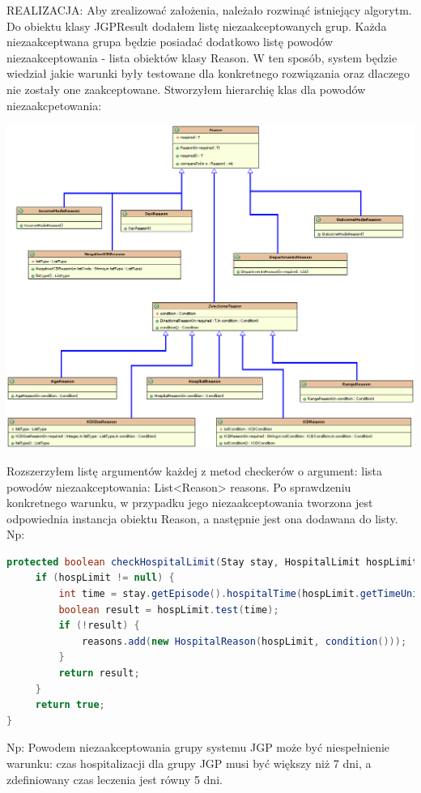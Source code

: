 REALIZACJA: Aby zrealizować założenia, należało rozwinąć istniejący algorytm. Do obiektu klasy JGPResult dodałem listę niezaakceptowanych grup. Każda niezaakceptwana grupa będzie posiadać dodatkowo listę powodów niezaakceptowania - lista obiektów klasy Reason. W ten sposób, system będzie wiedział jakie warunki były testowane dla konkretnego rozwiązania oraz dlaczego nie zostały one zaakceptowane. 
Stworzyłem hierarchię klas dla powodów niezaakcpetowania:

\includegraphics[scale=0.4]{images/reason-classes2}

Rozszerzyłem listę argumentów każdej z metod checkerów o argument: lista powodów niezaakceptowania: List<Reason> reasons. 
Po sprawdzeniu konkretnego warunku, w przypadku jego niezaakceptowania tworzona jest odpowiednia instancja obiektu Reason, a następnie jest ona  dodawana do listy. Np:

\begin{lstlisting}[language=Java]
protected boolean checkHospitalLimit(Stay stay, HospitalLimit hospLimit, List<Reason> reasons) {
     if (hospLimit != null) {
         int time = stay.getEpisode().hospitalTime(hospLimit.getTimeUnit());
         boolean result = hospLimit.test(time);
         if (!result) {
             reasons.add(new HospitalReason(hospLimit, condition()));
         }
         return result;
     }
     return true;
}
\end{lstlisting}

Np: Powodem niezaakceptowania grupy systemu JGP może być niespełnienie warunku: czas hospitalizacji dla grupy JGP musi być większy niż 7 dni, a zdefiniowany czas leczenia jest równy 5 dni.

